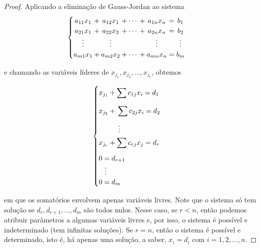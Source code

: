 \documentclass{article}
\begin{document}
\begin{proof} 
\par\vspace{0.3cm} Aplicando a eliminação de Gauss-Jordan ao sistema
\begin{align*}
\begin{cases}
\begin{array}{*{9}{@{}c@{}}}
a_{11}x_1 & {}+{} & a_{12}x_1 &{}+{} & \cdots & {}+{} & a_{1n}x_n & {}\mathrel{=}{} & b_1 \\
a_{21}x_1 & + & a_{22}x_2 & + & \cdots & + & a_{2n}x_n & = & b_2 \\
\vdots    &   & \vdots    &   &        &   & \vdots    &   & \vdots \\
a_{m1}x_1 & + & a_{m2}x_2 & + & \cdots & + & a_{mn}x_n & = & b_m \\
\end{array}
\end{cases}
\end{align*}
\par\vspace{0.3cm} e chamando as variáveis líderes de $x_{j_1}, x_{j_2}, \dots, x_{j_r}$, obtemos

\begin{align*}
\begin{cases}
\displaystyle{x_{j_1} + \sum_{}^{}c_{1j}x_i = d_1} \\
\displaystyle{x_{j_2}{}+{} \sum_{}^{}c_{2j}x_i = d_2} \\ 
\vdotswithin{\sum_{}^{}c_{2j}x_i = d_2}  \\
\displaystyle{x_{j_r} + \sum_{}^{}c_{rj}x_j = d_r} \\
0 = d_{r + 1} \\
\vdotswithin{d_{r+1}} \\
0 = d_m
\end{cases}
\end{align*}
\par\vspace{0.3cm} em que os somatórios envolvem apenas variáveis livres. Note que o sistema só tem solução se $d_r, d_{r+1}, \dots, d_m$ são todos nulos. Nesse caso, se $r<n$, então podemos atribuir parâmetros a algumas variáveis livres e, por isso, o sistema é possível e indeterminado (tem infinitas soluções). Se $r=n$, então o sistema é possível e determinado, isto é, há apenas uma solução, a saber, $x_i = d_i$ com $i=1, 2, \dots, n$.
\end{proof}
\end{document}
